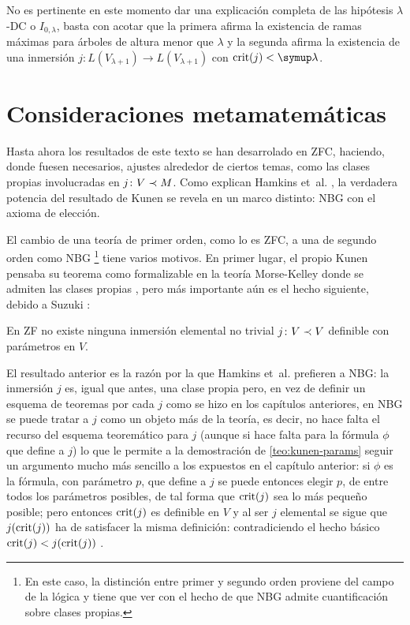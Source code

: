 No es pertinente en este momento dar una explicación completa de las hipótesis
$\lambda$-DC o $I_{0,\lambda}$, basta con acotar que la primera afirma la existencia
de ramas máximas para árboles de altura menor que $\lambda$ y la segunda afirma la existencia
de una inmersión $j\colon L(V_{\lambda+1})\to L(V_{\lambda+1})$
con $\crit{j}<\lambda$.

\section{Consideraciones metamatemáticas}

Hasta ahora los resultados de este texto se han desarrolado en ZFC,
haciendo, donde fuesen necesarios, ajustes alrededor de ciertos
temas, como las clases propias involucradas en $j\colon V\prec M$.
Como explican Hamkins et~al. \autocite{hamkins_generalizations_2012},
la verdadera potencia del resultado de Kunen se revela
en un marco distinto: NBG con el axioma de elección.

El cambio de una teoría de primer orden, como lo es ZFC, a una de segundo
orden como NBG%
\footnote{En este caso, la distinción entre primer y segundo orden
proviene del campo de la lógica y tiene que ver con el hecho de que NBG
admite cuantificación sobre clases propias.}
tiene varios motivos. En primer lugar, el propio Kunen pensaba su teorema como formalizable
en la teoría Morse-Kelley donde se admiten las clases propias \autocite[407]{kunen_elementary_1971},
pero más importante aún es el hecho siguiente, debido a Suzuki \autocite{suzuki_no_1999}:

\begin{teo}\label{teo:kunen-params}
    En ZF no existe ninguna inmersión elemental no trivial
    $j\colon V\prec V$ definible con parámetros en $V$.
\end{teo}

El resultado anterior es la razón por la que Hamkins et~al. prefieren a NBG:
la inmersión $j$ es, igual que antes, una clase propia pero, en vez de definir
un esquema de teoremas por cada $j$ como se hizo en los capítulos anteriores, en NBG
se puede tratar a $j$ como un objeto más de la teoría, es decir,
no hace falta el recurso del esquema teoremático para $j$ (aunque si hace falta
para la fórmula $\phi$ que define a $j$) lo que le permite a la demostración de \ref{teo:kunen-params}
seguir un argumento mucho más sencillo a los expuestos en el capítulo anterior:
si $\phi$ es la fórmula, con parámetro $p$, que define a $j$ se puede entonces elegir
$p$, de entre todos los parámetros posibles, de tal forma que $\operatorname{crit} (j)$ sea lo más
pequeño posible; pero entonces $\operatorname{crit} (j)$ es definible en $V$ y al ser $j$ elemental
se sigue que $j(\operatorname{crit} (j))$ ha de satisfacer la misma definición: contradiciendo el hecho
básico $\operatorname{crit} (j) < j(\operatorname{crit} (j))$ \autocite[Teorema 32]{hamkins_generalizations_2012}.

